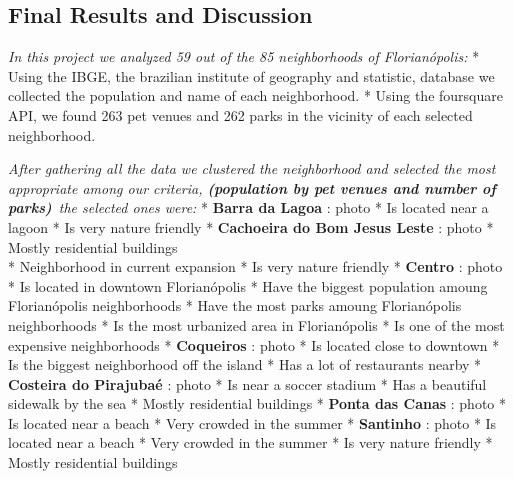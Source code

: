 \documentclass[11pt]{article}
\begin{document}
    \hypertarget{final-results-and-discussion}{%
\subsection{Final Results and
Discussion}\label{final-results-and-discussion}}

    \emph{In this project we analyzed 59 out of the 85 neighborhoods of
Florianópolis:} * Using the IBGE, the brazilian institute of geography
and statistic, database we collected the population and name of each
neighborhood. * Using the foursquare API, we found 263 pet venues and
262 parks in the vicinity of each selected neighborhood.

\emph{After gathering all the data we clustered the neighborhood and
selected the most appropriate among our criteria, \textbf{(population by
pet venues and number of parks)}~the selected ones were:} *
\textbf{Barra da Lagoa} : photo * Is located near a lagoon * Is very
nature friendly * \textbf{Cachoeira do Bom Jesus Leste} : photo * Mostly
residential buildings\\
* Neighborhood in current expansion * Is very nature friendly *
\textbf{Centro} : photo * Is located in downtown Florianópolis * Have
the biggest population amoung Florianópolis neighborhoods * Have the
most parks amoung Florianópolis neighborhoods * Is the most urbanized
area in Florianópolis * Is one of the most expensive neighborhoods *
\textbf{Coqueiros} : photo * Is located close to downtown * Is the
biggest neighborhood off the island * Has a lot of restaurants nearby *
\textbf{Costeira do Pirajubaé} : photo * Is near a soccer stadium * Has
a beautiful sidewalk by the sea * Mostly residential buildings *
\textbf{Ponta das Canas} : photo * Is located near a beach * Very
crowded in the summer * \textbf{Santinho} : photo * Is located near a
beach * Very crowded in the summer * Is very nature friendly * Mostly
residential buildings


    
    
    
\end{document}
